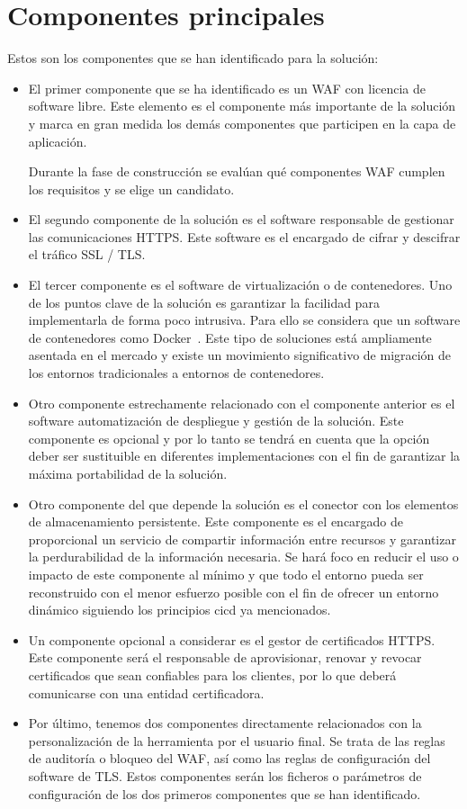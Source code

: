 \section{Componentes principales}
\par Estos son los componentes que se han identificado para la solución:
\begin{itemize}
  \item El primer componente que se ha identificado es un WAF con licencia de software libre. Este elemento es el componente más importante de la solución y
    marca en gran medida los demás componentes que participen en la capa de aplicación.
    \par Durante la fase de construcción se evalúan qué componentes WAF cumplen los requisitos y se elige un candidato.
  \item El segundo componente de la solución es el software responsable de gestionar las comunicaciones HTTPS. Este software es el encargado de cifrar y
    descifrar el tráfico SSL / TLS.
  \item El tercer componente es el software de virtualización o de contenedores. Uno de los puntos clave de la solución es garantizar la facilidad para
    implementarla de forma poco intrusiva. Para ello se considera que un software de contenedores como Docker~\cite{docker}. Este tipo de soluciones está
    ampliamente asentada en el mercado y existe un movimiento significativo de migración de los entornos tradicionales a entornos de contenedores.
  \item Otro componente estrechamente relacionado con el componente anterior es el software automatización de despliegue y gestión de la solución. Este
    componente es opcional y por lo tanto se tendrá en cuenta que la opción deber ser sustituible en diferentes implementaciones con el fin de garantizar la
    máxima portabilidad de la solución.
  \item Otro componente del que depende la solución es el conector con los elementos de almacenamiento persistente. Este componente es el encargado de
    proporcional un servicio de compartir información entre recursos y garantizar la perdurabilidad de la información necesaria. Se hará foco en reducir el uso
    o impacto de este componente al mínimo y que todo el entorno pueda ser reconstruido con el menor esfuerzo posible con el fin de ofrecer un entorno dinámico
    siguiendo los principios \acrshort{cicd} ya mencionados.
  \item Un componente opcional a considerar es el gestor de certificados HTTPS. Este componente será el responsable de aprovisionar, renovar y revocar certificados que sean confiables para los clientes, por lo que deberá
    comunicarse con una entidad certificadora.
  \item Por último, tenemos dos componentes directamente relacionados con la personalización de la herramienta por el usuario final. Se trata de las reglas de
    auditoría o bloqueo del WAF, así como las reglas de configuración del software de TLS. Estos componentes serán los ficheros o parámetros de configuración de
    los dos primeros componentes que se han identificado.
\end{itemize}


